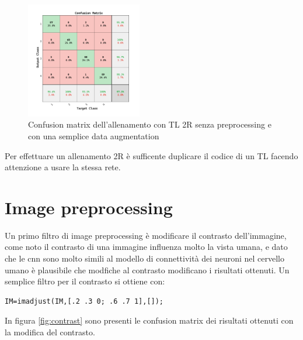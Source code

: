\begin{figure}[ht]
    \centering
    \includegraphics[width=0.45\textwidth]{addestramento-rete-neurale/two-liscio.pdf}
    \caption{Confusion matrix dell'allenamento con TL 2R senza preprocessing e con una semplice data augmentation}
    \label{fig:two-liscio}
\end{figure}

Per effettuare un allenamento 2R è sufficente duplicare il codice di un TL facendo attenzione a usare la stessa rete.

\section{Image preprocessing}\label{image-preprocessing}

Un primo filtro di image preprocessing è modificare il contrasto dell'immagine, come noto il contrasto di una immagine influenza molto la vista umana, e dato che le \gls{cnn} sono molto simili al modello di connettività dei neuroni nel cervello umano è plausibile che modfiche al contrasto modificano i risultati  ottenuti. Un semplice filtro per il contrasto si ottiene con:
\begin{lstlisting}
IM=imadjust(IM,[.2 .3 0; .6 .7 1],[]);    
\end{lstlisting}

In figura \cref{fig:contrast} sono presenti le confusion matrix dei risultati ottenuti con la modifica del contrasto.


